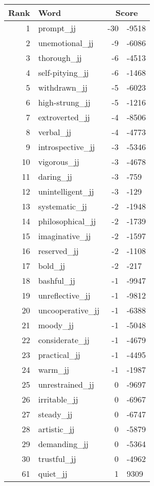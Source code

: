 \begin{longtable}[!htbp]{| rlr@{.}l |}
    \hline
    \textbf{Rank} & \textbf{Word} & \multicolumn{2}{c|}{\textbf{Score}} \\
    \hline
    \endhead
    1 & prompt\_jj & -30 & -9518 \\
    2 & unemotional\_jj & -9 & -6086 \\
    3 & thorough\_jj & -6 & -4513 \\
    4 & self-pitying\_jj & -6 & -1468 \\
    5 & withdrawn\_jj & -5 & -6023 \\
    6 & high-strung\_jj & -5 & -1216 \\
    7 & extroverted\_jj & -4 & -8506 \\
    8 & verbal\_jj & -4 & -4773 \\
    9 & introspective\_jj & -3 & -5346 \\
    10 & vigorous\_jj & -3 & -4678 \\
    11 & daring\_jj & -3 & -759 \\
    12 & unintelligent\_jj & -3 & -129 \\
    13 & systematic\_jj & -2 & -1948 \\
    14 & philosophical\_jj & -2 & -1739 \\
    15 & imaginative\_jj & -2 & -1597 \\
    16 & reserved\_jj & -2 & -1108 \\
    17 & bold\_jj & -2 & -217 \\
    18 & bashful\_jj & -1 & -9947 \\
    19 & unreflective\_jj & -1 & -9812 \\
    20 & uncooperative\_jj & -1 & -6388 \\
    21 & moody\_jj & -1 & -5048 \\
    22 & considerate\_jj & -1 & -4679 \\
    23 & practical\_jj & -1 & -4495 \\
    24 & warm\_jj & -1 & -1987 \\
    25 & unrestrained\_jj & 0 & -9697 \\
    26 & irritable\_jj & 0 & -6967 \\
    27 & steady\_jj & 0 & -6747 \\
    28 & artistic\_jj & 0 & -5879 \\
    29 & demanding\_jj & 0 & -5364 \\
    30 & trustful\_jj & 0 & -4962 \\
    61 & quiet\_jj & 1 & 9309 \\

\end{longtable}
